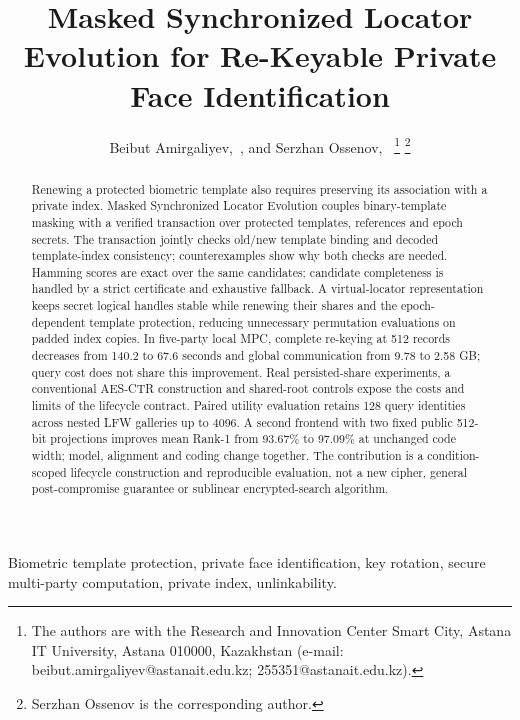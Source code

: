 \documentclass[journal]{IEEEtran}
\begin{document}
\title{Masked Synchronized Locator Evolution for Re-Keyable Private Face Identification}
\author{Beibut Amirgaliyev,~, and Serzhan Ossenov,~%
\thanks{The authors are with the Research and Innovation Center Smart City, Astana IT University, Astana 010000, Kazakhstan (e-mail: beibut.amirgaliyev@astanait.edu.kz; 255351@astanait.edu.kz).}%
\thanks{Serzhan Ossenov is the corresponding author.}}
\maketitle
\begin{abstract}
Renewing a protected biometric template also requires preserving its association with a private index. Masked Synchronized Locator Evolution couples binary-template masking with a verified transaction over protected templates, references and epoch secrets. The transaction jointly checks old/new template binding and decoded template-index consistency; counterexamples show why both checks are needed. Hamming scores are exact over the same candidates; candidate completeness is handled by a strict certificate and exhaustive fallback. A virtual-locator representation keeps secret logical handles stable while renewing their shares and the epoch-dependent template protection, reducing unnecessary permutation evaluations on padded index copies. In five-party local MPC, complete re-keying at 512 records decreases from 140.2 to 67.6 seconds and global communication from 9.78 to 2.58 GB; query cost does not share this improvement. Real persisted-share experiments, a conventional AES-CTR construction and shared-root controls expose the costs and limits of the lifecycle contract. Paired utility evaluation retains 128 query identities across nested LFW galleries up to 4096. A second frontend with two fixed public 512-bit projections improves mean Rank-1 from 93.67\% to 97.09\% at unchanged code width; model, alignment and coding change together. The contribution is a condition-scoped lifecycle construction and reproducible evaluation, not a new cipher, general post-compromise guarantee or sublinear encrypted-search algorithm.
\end{abstract}
\begin{IEEEkeywords}
Biometric template protection, private face identification, key rotation, secure multi-party computation, private index, unlinkability.
\end{IEEEkeywords}
\end{document}
